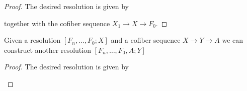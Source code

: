 \begin{proof}
  The desired resolution is given by
  \begin{center}
  \end{center}
  together with the cofiber sequence
  $X_1 \to X \to F_0$.
\end{proof}

\begin{cnstr}[Appending]
  Given a resolution $ [F_n, \dots, F_0; X] $
  and a cofiber sequence $X \to Y \to A$ 
  we can construct another resolution
  $ [F_n, \dots, F_0, A; Y] $
\end{cnstr}

\begin{proof}
  The desired resolution is given by
  \begin{center}
  \end{center}
\end{proof}


